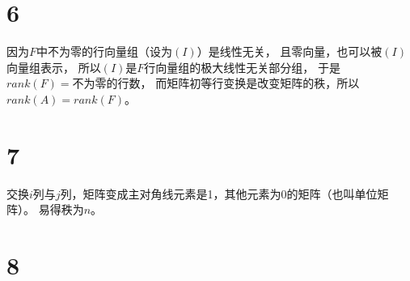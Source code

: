 \documentclass{article}
\begin{document}
\section*{6}

因为$F$中不为零的行向量组（设为$(I)$）是线性无关，
且零向量，也可以被$(I)$向量组表示，
所以$(I)$是$F$行向量组的极大线性无关部分组，
于是$rank(F) = \text{不为零的行数}$，
而矩阵初等行变换是改变矩阵的秩，所以$rank(A) = rank(F)$。

\section*{7}

交换$i$列与$j$列，矩阵变成主对角线元素是1，其他元素为0的矩阵（也叫单位矩阵）。
易得秩为$n$。

\section*{8}
\end{document}
